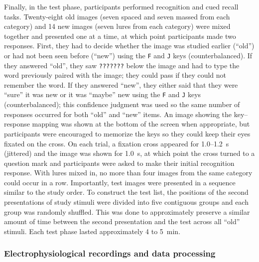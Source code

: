 Finally, in the test phase, participants performed recognition and cued recall tasks.  Twenty-eight old images (seven spaced and seven massed from each category) and 14 new images (seven lures from each category) were mixed together and presented one at a time, at which point participants made two responses.  First, they had to decide whether the image was studied earlier (``old'') or had not been seen before (``new'') using the \texttt{F} and \texttt{J} keys (counterbalanced).  If they answered ``old'', they saw \texttt{???????} below the image and had to type the word previously paired with the image; they could pass if they could not remember the word.  If they answered ``new'', they either said that they were ``sure'' it was new or it was ``maybe'' new using the \texttt{F} and \texttt{J} keys (counterbalanced); this confidence judgment was used so the same number of responses occurred for both ``old'' and ``new'' items. An image showing the key--response mapping was shown at the bottom of the screen when appropriate, but participants were encouraged to memorize the keys so they could keep their eyes fixated on the cross.  On each trial, a fixation cross appeared for 1.0--1.2~s (jittered) and the image was shown for 1.0~s, at which point the cross turned to a question mark and participants were asked to make their initial recognition response.  With lures mixed in, no more than four images from the same category could occur in a row.  Importantly, test images were presented in a sequence similar to the study order.  To construct the test list, the positions of the second presentations of study stimuli were divided into five contiguous groups and each group was randomly shuffled.  This was done to approximately preserve a similar amount of time between the second presentation and the test across all ``old'' stimuli.  Each test phase lasted approximately 4 to 5~min.





\subsubsection{Electrophysiological recordings and data processing}

